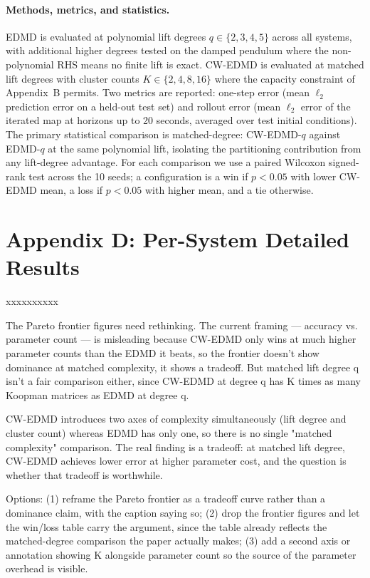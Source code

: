 \documentclass{article}
\begin{document}
\paragraph{Methods, metrics, and statistics.} EDMD is evaluated at polynomial lift 
degrees $q \in \{2,3,4,5\}$ across all systems, with additional higher degrees tested 
on the damped pendulum where the non-polynomial RHS means no finite lift is exact. 
CW-EDMD is evaluated at matched lift degrees with cluster counts $K \in \{2,4,8,16\}$ 
where the capacity constraint of Appendix~B permits. Two metrics are reported: 
one-step error (mean $\ell_2$ prediction error on a held-out test set) and rollout 
error (mean $\ell_2$ error of the iterated map at horizons up to 20 seconds, averaged 
over test initial conditions). The primary statistical comparison is matched-degree: 
CW-EDMD-$q$ against EDMD-$q$ at the same polynomial lift, isolating the partitioning 
contribution from any lift-degree advantage. For each comparison we use a paired 
Wilcoxon signed-rank test across the 10 seeds; a configuration is a win if $p < 0.05$ 
with lower CW-EDMD mean, a loss if $p < 0.05$ with higher mean, and a tie otherwise.


\section*{Appendix D: Per-System Detailed Results}


xxxxxxxxxx

The Pareto frontier figures need rethinking. The current framing — accuracy vs. parameter 
count — is misleading because CW-EDMD only wins at much higher parameter counts than the 
EDMD it beats, so the frontier doesn't show dominance at matched complexity, it shows a 
tradeoff. But matched lift degree q isn't a fair comparison either, since CW-EDMD at 
degree q has K times as many Koopman matrices as EDMD at degree q.

CW-EDMD introduces two axes of complexity simultaneously 
(lift degree and cluster count) whereas EDMD has only one, so there is no single 
"matched complexity" comparison. The real finding is a tradeoff: at matched lift degree, 
CW-EDMD achieves lower error at higher parameter cost, and the question is whether that 
tradeoff is worthwhile.

Options: (1) reframe the Pareto frontier as a tradeoff curve rather than a 
dominance claim, with the caption saying so; (2) drop the frontier figures and let the 
win/loss table carry the argument, since the table already reflects the matched-degree 
comparison the paper actually makes; (3) add a second axis or annotation showing K 
alongside parameter count so the source of the parameter overhead is visible. 
\end{document}
